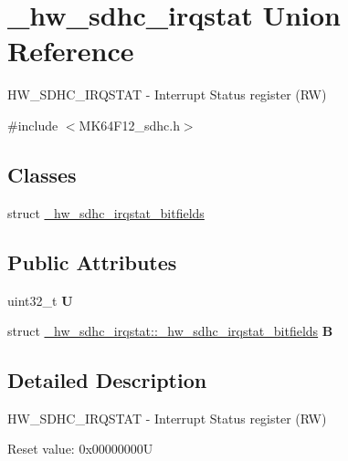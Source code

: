 \hypertarget{union__hw__sdhc__irqstat}{}\section{\+\_\+hw\+\_\+sdhc\+\_\+irqstat Union Reference}
\label{union__hw__sdhc__irqstat}


H\+W\+\_\+\+S\+D\+H\+C\+\_\+\+I\+R\+Q\+S\+T\+AT -\/ Interrupt Status register (RW)  




{\ttfamily \#include $<$M\+K64\+F12\+\_\+sdhc.\+h$>$}

\subsection*{Classes}
\begin{DoxyCompactItemize}
\item 
struct \hyperlink{struct__hw__sdhc__irqstat_1_1__hw__sdhc__irqstat__bitfields}{\+\_\+hw\+\_\+sdhc\+\_\+irqstat\+\_\+bitfields}
\end{DoxyCompactItemize}
\subsection*{Public Attributes}
\begin{DoxyCompactItemize}
\item 
uint32\+\_\+t {\bfseries U}\hypertarget{union__hw__sdhc__irqstat_a27f3a71195b7c174f7f155f74b235b2f}{}\label{union__hw__sdhc__irqstat_a27f3a71195b7c174f7f155f74b235b2f}

\item 
struct \hyperlink{struct__hw__sdhc__irqstat_1_1__hw__sdhc__irqstat__bitfields}{\+\_\+hw\+\_\+sdhc\+\_\+irqstat\+::\+\_\+hw\+\_\+sdhc\+\_\+irqstat\+\_\+bitfields} {\bfseries B}\hypertarget{union__hw__sdhc__irqstat_a30c235d227587b711d091e18bc5cd295}{}\label{union__hw__sdhc__irqstat_a30c235d227587b711d091e18bc5cd295}

\end{DoxyCompactItemize}


\subsection{Detailed Description}
H\+W\+\_\+\+S\+D\+H\+C\+\_\+\+I\+R\+Q\+S\+T\+AT -\/ Interrupt Status register (RW) 

Reset value\+: 0x00000000U

